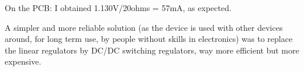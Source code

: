 \documentclass[a4paper]{article}
\begin{document}
On the PCB: I obtained 1.130V/20ohms = 57mA, as expected.

A simpler and more reliable solution (as the device is used with other devices around, for long term use, by people without skills in electronics) was to replace the linear regulators by DC/DC switching regulators, way more efficient but more expensive.

\newpage












\end{document}
